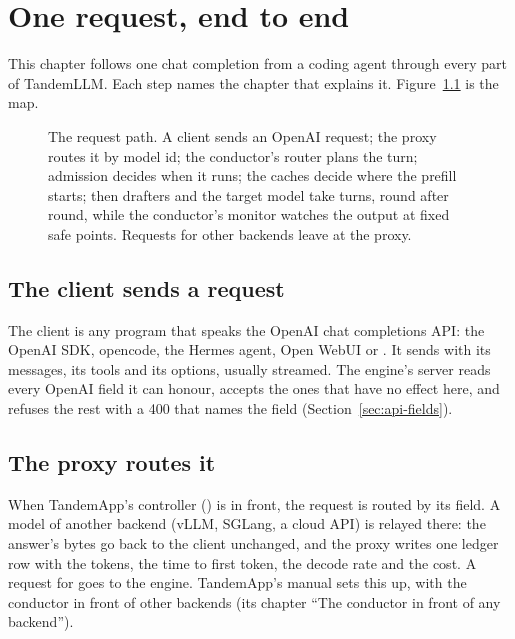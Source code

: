 \chapter{One request, end to end}\label{ch:tour}

This chapter follows one chat completion from a coding agent through every part of TandemLLM. Each step names the chapter that explains it. Figure~\ref{fig:request-path} is the map.

\begin{figure}[htbp]
\centering

\caption{The request path. A client sends an OpenAI request; the proxy routes it by model id; the conductor's router plans the turn; admission decides when it runs; the caches decide where the prefill starts; then drafters and the target model take turns, round after round, while the conductor's monitor watches the output at fixed safe points. Requests for other backends leave at the proxy.}\label{fig:request-path}
\end{figure}

\section{The client sends a request}

The client is any program that speaks the OpenAI chat completions API: the OpenAI SDK, opencode, the Hermes agent, Open WebUI or . It sends  with its messages, its tools and its options, usually streamed. The engine's server reads every OpenAI field it can honour, accepts the ones that have no effect here, and refuses the rest with a 400 that names the field (Section~\ref{sec:api-fields}).

\section{The proxy routes it}

When TandemApp's controller () is in front, the request is routed by its  field. A model of another backend (vLLM, SGLang, a cloud API) is relayed there: the answer's bytes go back to the client unchanged, and the proxy writes one ledger row with the tokens, the time to first token, the decode rate and the cost. A request for  goes to the engine. TandemApp's manual sets this up, with the conductor in front of other backends (its chapter \enquote{The conductor in front of any backend}).

